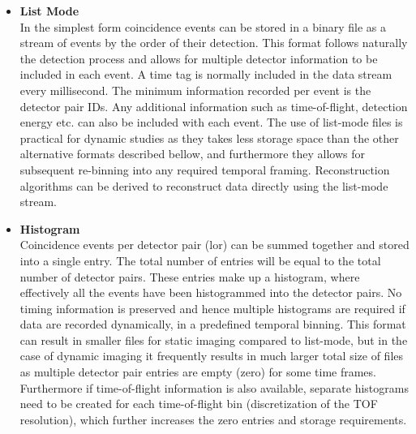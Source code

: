 \begin{itemize}

\item\textbf{List Mode}\\
In the simplest form coincidence events can be stored in a binary file as a stream of events by the order of their detection. This format follows naturally the detection process and allows for multiple detector information to be included in each event. A time tag is normally included in the data stream every millisecond. The minimum information recorded per event is the detector pair IDs. Any additional information such as time-of-flight, detection energy etc. can also be included with each event.
The use of list-mode files is practical for dynamic studies as they takes less storage space than the other alternative formats described bellow, and furthermore they allows for subsequent re-binning into any required temporal framing. Reconstruction algorithms can be derived to reconstruct data directly using the list-mode stream.

\item\textbf{Histogram}\\
Coincidence events per detector pair (\gls{lor}) can be summed together and stored into a single entry. The total number of entries will be equal to the total number of detector pairs. These entries make up a histogram, where effectively all the events have been histogrammed into the detector pairs. No timing information is preserved and hence multiple histograms are required if data are recorded dynamically, in a predefined temporal binning. 
This format can result in smaller files for static imaging compared to list-mode, but in the case of dynamic imaging it frequently results in much larger total size of files as multiple detector pair entries are empty (zero) for some time frames. Furthermore if time-of-flight information is also available, separate histograms need to be created for each time-of-flight bin (discretization of the TOF resolution), which further increases the zero entries and storage requirements. 


\end{itemize}
